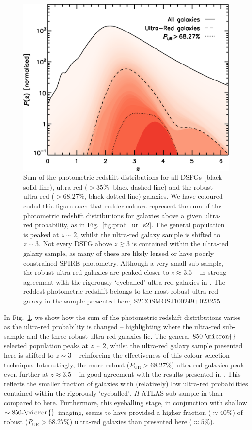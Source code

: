 \documentclass[a4paper, fleqn, usenatbib]{mnras}
\newcommand{\millijanksy}{\text{mJy}}
\newcommand{\pur}{P_{\text{UR}}}
\newcommand{\urg}{ultra-red galaxy}
\newcommand{\urgs}{ultra-red galaxies}
\begin{document}
\begin{figure}
    \includegraphics[width=\columnwidth]{photoz_s2}
    \caption{Sum of the photometric redshift distributions for all DSFGs (black solid line), ultra-red ($>35\%$, black dashed line) and the robust ultra-red ($>68.27\%$, black dotted line) galaxies.
    We have coloured-coded this figure such that redder colours represent the sum of the photometric redshift distributions for galaxies above a given ultra-red probability, as in Fig.~\ref{fig:prob_ur_s2}.
    The general population is peaked at $z\sim2$, whilst the \urg{} sample is shifted to $z\sim3$.
    Not every DSFG above $z\gtrsim3$ is contained within the \urg{} sample, as many of these are likely lensed \citep[$S_{500}\ge100\,\millijanksy{}$, e.g.][]{ikarashi11} or have poorly constrained SPIRE photometry.
    Although a very small sub-sample, the robust \urgs{} are peaked closer to $z\approx3.5$ -- in strong agreement with the rigorously `eyeballed' \urgs{} in .
    The reddest photometric redshift belongs to the most robust \urg{} in the sample presented here, S2COSMOSJ100249$+$023255.}
    \label{fig:photoz_s2}
\end{figure}

In Fig.~\ref{fig:photoz_s2}, we show how the sum of the photometric redshift distributions varies as the ultra-red probability is changed -- highlighting where the ultra-red sub-sample and the three robust \urgs{} lie.
The general $850\text{-}\micron{}$-selected population peaks at $z\sim2$, whilst the \urg{} sample presented here is shifted to $z\sim3$ -- reinforcing the effectiveness of this colour-selection technique.
Interestingly, the more robust ($\pur{}>68.27\%$) \urgs{} peak even further at $z\approx3.5$ -- in good agreement with the results presented in .
This reflects the smaller fraction of galaxies with (relatively) low ultra-red probabilities contained within the rigorously `eyeballed', \textit{H}-ATLAS sub-sample in  than compared to here.
Furthermore, this eyeballing stage, in conjunction with shallow $\sim850\text{-}\micron{}$ imaging, seems to have provided a higher fraction ($\approx40\%$) of robust ($\pur{}>68.27\%$) \urgs{} than presented here ($\approx5\%$).
\end{document}
